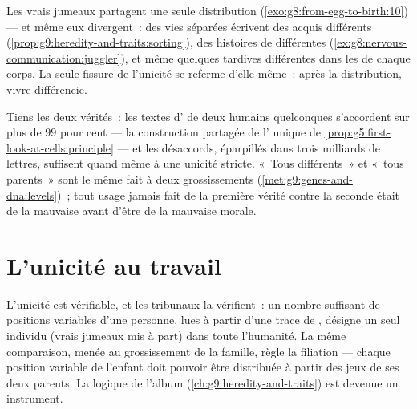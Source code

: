 \begin{example}\label{ex:g9:unique-individuals:twins}
Les vrais jumeaux partagent une seule distribution
(\cref{exo:g8:from-egg-to-birth:10}) --- et même eux
divergent~: des vies séparées écrivent des  acquis
différents (\cref{prop:g9:heredity-and-traits:sorting}), des
histoires de  différentes
(\cref{ex:g8:nervous-communication:juggler}), et même
quelques  tardives différentes dans les  de
chaque corps. La seule fissure de l'unicité se referme
d'elle-même~: après la distribution, vivre différencie.
\end{example}

\begin{remark}\label{rem:g9:unique-individuals:alike}
Tiens les deux vérités~: les textes d' de deux humains
quelconques s'accordent sur plus de $99$ pour cent --- la
construction partagée de l' unique de
\cref{prop:g5:first-look-at-cells:principle} --- et les
désaccords, éparpillés dans trois milliards de lettres,
suffisent quand même à une unicité stricte. «~Tous
différents~» et «~tous parents~» sont le même fait à deux
grossissements (\cref{met:g9:genes-and-dna:levels})~; tout
usage jamais fait de la première vérité contre la seconde
était de la mauvaise  avant d'être de la mauvaise
morale.
\end{remark}

\section{L'unicité au travail}

\begin{example}\label{ex:g9:unique-individuals:forensics}
L'unicité est vérifiable, et les tribunaux la vérifient~:
un nombre suffisant de positions variables d'une personne,
lues à partir d'une trace de , désigne un seul
individu (vrais jumeaux mis à part) dans toute l'humanité.
La même comparaison, menée au grossissement de la famille,
règle la filiation --- chaque position variable de l'enfant
doit pouvoir être distribuée à partir des jeux de ses deux
parents. La logique de l'album
(\cref{ch:g9:heredity-and-traits}) est devenue un
instrument.
\end{example}


